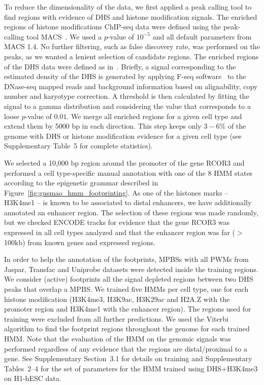 
To reduce the dimensionality of the data, we first applied a peak calling tool
to find regions with evidence of DHS and histone modification signals. The enriched
regions of histone modifications ChIP-seq data were defined using the peak-calling
tool MACS~\cite{zhang2008}. We used a $p$-value of $ 10^{-5} $ and all default
parameters from MACS 1.4. No further filtering, such as false discovery rate, was
performed on the peaks, as we wanted a lenient selection of candidate regions. The
enriched regions of the DHS data were defined as in~\cite{boyle2011}. Briefly, a
signal corresponding to the estimated density of the DHS is generated by applying F-seq
software~\cite{boyle2008b} to the DNase-seq mapped reads and background information
based on alignability, copy number and karyotype correction. A threshold is then
calculated by fitting the signal to a gamma distribution and considering the value
that corresponds to a loose $p$-value of $ 0.01 $. We merge all enriched regions
for a given cell type and extend them by 5000 bp in each direction. This step keeps
only $3-6\%$ of the genome with DHS or histone modification evidence for a given
cell type (see Supplementary Table~5 for complete statistics).

We selected a 10,000 bp region around the promoter of the gene RCOR3 and performed
a cell type-specific manual annotation with one of the 8 HMM states according to the
epigenetic grammar described in Figure~\ref{fig:gusmao_hmm_footprinting}. As one of the histones marks
-- H3K4me1 -- is known to be associated to distal enhancers, we have additionally
annotated an enhancer region. The selection of these regions was made randomly, but
we checked ENCODE tracks for evidence that the gene RCOR3 was expressed in all cell types
analyzed and that the enhancer region was far ($>$100kb) from known genes and expressed
regions.

In order to help the annotation of the footprints, MPBSs with all PWMs from Jaspar,
Transfac and Uniprobe datasets were detected inside the training regions. We consider
(active) footprints all the signal depleted regions between two DHS peaks that overlap
a MPBS. We trained five HMMs per cell type, one for each histone modification (H3K4me3, H3K9ac,
H3K29ac and H2A.Z with the promoter region and H3K4me1 with the enhancer region). The regions
used for training were excluded from all further predictions. We used the Viterbi algorithm
to find the footprint regions throughout the genome for each trained HMM. Note that the
evaluation of the HMM on the genomic signals was performed regardless of any evidence that
the regions are distal/proximal to a gene. See Supplementary Section~3.1 for details
on training and Supplementary Tables~2--4 for the set of parameters for the HMM trained
using DHS+H3K4me3 on H1-hESC data.

